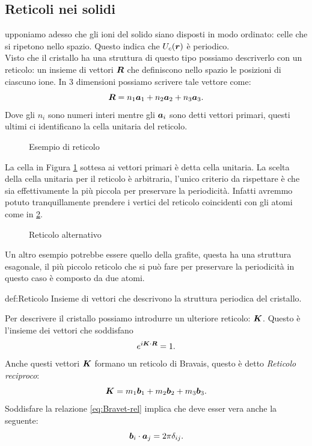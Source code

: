 \subsection{Reticoli nei solidi}
\label{subsec:Reticoli nei solidi}
upponiamo adesso che gli ioni del solido siano disposti in modo ordinato: celle che si ripetono nello spazio. Questo indica che $U_c(\boldsymbol{r})$ è periodico.\\
Visto che il cristallo ha una struttura di questo tipo possiamo descriverlo con un reticolo: un insieme di vettori $\boldsymbol{R}$ che definiscono nello spazio le posizioni di ciascuno ione. In 3 dimensioni possiamo scrivere tale vettore come:
\[
	\boldsymbol{R} = n_1 \boldsymbol{a}_1 + n_2 \boldsymbol{a}_2 + n_3 \boldsymbol{a}_3	
.\] 
Dove gli $n_i$ sono numeri interi mentre gli $\boldsymbol{a}_i$ sono detti vettori primari, questi ultimi ci identificano la cella unitaria del reticolo.
\begin{figure}[ht]
    \centering
    \caption{Esempio di reticolo}
    \label{fig:esempio-di-reticolo}
\end{figure}
La cella in Figura \ref{fig:esempio-di-reticolo} sottesa ai vettori primari è detta cella unitaria.
La scelta della cella unitaria per il reticolo è arbitraria, l'unico criterio da rispettare è che sia effettivamente la più piccola per preservare la periodicità. Infatti avremmo potuto tranquillamente prendere i vertici del reticolo coincidenti con gli atomi come in \ref{fig:reticolo-alternativo}.
\begin{figure}[ht]
    \centering
    \caption{Reticolo alternativo}
    \label{fig:reticolo-alternativo}
\end{figure}
Un altro esempio potrebbe essere quello della grafite, questa ha una struttura esagonale, il più piccolo reticolo che si può fare per preservare la periodicità in questo caso è composto da due atomi.
\begin{defn}{def:Reticolo}
	Insieme di vettori che descrivono la struttura periodica del cristallo.
\end{defn}
Per descrivere il cristallo possiamo introdurre un ulteriore reticolo: $\boldsymbol{K}$. Questo è l'insieme dei vettori che soddisfano
\[
	e^{i \boldsymbol{K}\cdot\boldsymbol{R}}=1 \label{eq:Bravet-rel}
.\] 
Anche questi vettori $\boldsymbol{K}$ formano un reticolo di Bravais, questo è detto \textit{Reticolo reciproco}:
\[
	 \boldsymbol{K}=m_1\boldsymbol{b}_1 + m_2\boldsymbol{b}_2 + m_3\boldsymbol{b}_3
.\] 
Soddisfare la relazione \ref{eq:Bravet-rel} implica che deve esser vera anche la seguente:
\[
	\boldsymbol{b}_i \cdot  \boldsymbol{a}_j=2\pi\delta_{ij}
.\] 

